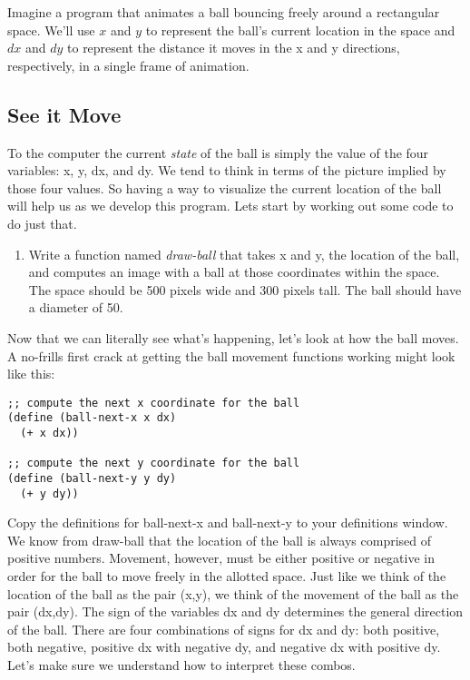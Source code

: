 \documentclass[nobib]{tufte-handout}
\begin{document}
Imagine a program that animates a ball bouncing freely around a rectangular space.  We'll use \(x\) and \(y\) to represent the ball's current location in the space and \(dx\) and \(dy\) to represent the distance it moves in the x and y directions, respectively, in a single frame of animation.


\subsection*{See it Move}

To the computer the current \textit{state} of the ball is simply the value of the four variables: x, y, dx, and dy. We tend to think in terms of the picture implied by those four values. So having a way to visualize the current location of the ball will help us as we develop this program.  Lets start by working out some code to do just that.

\begin{enumerate}
\item Write a function named \textit{draw-ball} that takes x and y, the location of the ball, and computes an image with a ball at those coordinates within the space. The space should be 500 pixels wide and 300 pixels tall. The ball should have a diameter of 50.
\end{enumerate}

Now that we can literally see what's happening, let's look at how the ball moves. A no-frills first crack at getting the ball movement functions working might look like this:

\begin{lstlisting}
;; compute the next x coordinate for the ball
(define (ball-next-x x dx)
  (+ x dx))

;; compute the next y coordinate for the ball
(define (ball-next-y y dy)
  (+ y dy))
\end{lstlisting}

Copy the definitions for ball-next-x and ball-next-y to your definitions window. We know from draw-ball that the location of the ball is always comprised of positive numbers. Movement, however, must be either positive or negative in order for the ball to move freely in the allotted space. Just like we think of the location of the ball as the pair (x,y), we think of the movement of the ball as the pair (dx,dy).  The sign of the variables dx and dy determines the general direction of the ball. There are four combinations of signs for dx and dy: both positive, both negative, positive dx with negative dy, and negative dx with positive dy. Let's make sure we understand how to interpret these combos.
\end{document}
